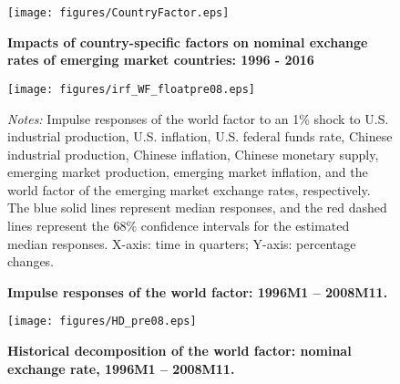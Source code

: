 \documentclass[12pt]{article}
\numberwithin{equation}{section}
\begin{document}
\begin{figure}[h!]
\centering
\caption{\textbf{Impacts of country-specific factors on nominal exchange rates of emerging market countries: 1996 - 2016 }}
\texttt{[image: figures/CountryFactor.eps]}
%
\label{fig:Cfactors}
\end{figure}
\newpage

\begin{figure}
\centering
\caption{\textbf{Impulse responses of the world factor: 1996M1 -- 2008M11. }}
\texttt{[image: figures/irf\_WF\_floatpre08.eps]}\label{fig:IRF_WF_before1}

\begin{minipage}{1\linewidth}
		\footnotesize
	\emph{Notes:} Impulse responses of the world factor to an  1\%  shock to U.S. industrial production, U.S. inflation, U.S. federal funds rate, Chinese industrial production, Chinese inflation, Chinese monetary supply, emerging market production, emerging market inflation, and the world factor of the emerging market exchange rates, respectively. The blue solid lines represent median responses, and the red dashed lines represent the 68\% confidence intervals for the estimated median responses. X-axis:  time in quarters; Y-axis:  percentage changes.
\end{minipage}
\end{figure}
\newpage

\begin{figure}
\centering
\caption{\textbf{Historical decomposition of the world factor: nominal exchange rate, 1996M1 -- 2008M11.}}
\texttt{[image: figures/HD\_pre08.eps]}

\label{fig:HD_WF_before1}
\end{figure}

%
\end{document}

